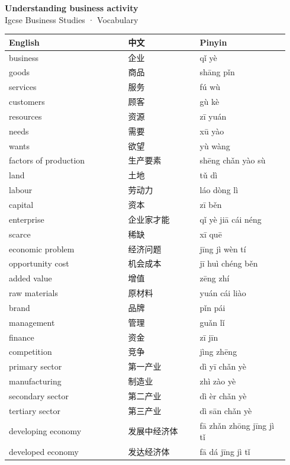 \documentclass[11pt]{article}
\begin{document}
\begin{center}
  {\LARGE\bfseries Understanding business activity}\\[0.35em]
  {\large Igcse Business Studies · Vocabulary}
\end{center}
\vspace{0.6em}

\begin{longtable}{@{}p{0.40\linewidth}p{0.24\linewidth}p{0.30\linewidth}@{}}
\toprule
\textbf{English} & \textbf{中文} & \textbf{Pinyin} \\
\midrule
\endhead
\bottomrule
\endlastfoot
business & 企业 & qǐ yè \\
goods & 商品 & shāng pǐn \\
services & 服务 & fú wù \\
customers & 顾客 & gù kè \\
resources & 资源 & zī yuán \\
needs & 需要 & xū yào \\
wants & 欲望 & yù wàng \\
factors of production & 生产要素 & shēng chǎn yào sù \\
land & 土地 & tǔ dì \\
labour & 劳动力 & láo dòng lì \\
capital & 资本 & zī běn \\
enterprise & 企业家才能 & qǐ yè jiā cái néng \\
scarce & 稀缺 & xī quē \\
economic problem & 经济问题 & jīng jì wèn tí \\
opportunity cost & 机会成本 & jī huì chéng běn \\
added value & 增值 & zēng zhí \\
raw materials & 原材料 & yuán cái liào \\
brand & 品牌 & pǐn pái \\
management & 管理 & guǎn lǐ \\
finance & 资金 & zī jīn \\
competition & 竞争 & jìng zhēng \\
primary sector & 第一产业 & dì yī chǎn yè \\
manufacturing & 制造业 & zhì zào yè \\
secondary sector & 第二产业 & dì èr chǎn yè \\
tertiary sector & 第三产业 & dì sān chǎn yè \\
developing economy & 发展中经济体 & fā zhǎn zhōng jīng jì tǐ \\
developed economy & 发达经济体 & fā dá jīng jì tǐ \\

\end{longtable}
\end{document}
